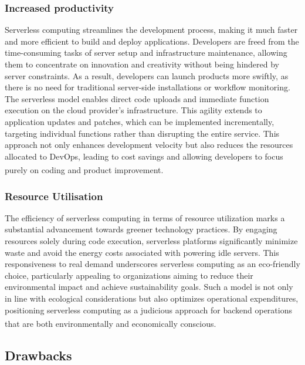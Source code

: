 \subsubsection{Increased productivity}
Serverless computing streamlines the development process, making it much faster and more efficient
to build and deploy applications. Developers are freed from the time-consuming tasks of server setup
and infrastructure maintenance, allowing them to concentrate on innovation and creativity without
being hindered by server constraints. As a result, developers can launch products more swiftly, as
there is no need for traditional server-side installations or workflow monitoring. The serverless
model enables direct code uploads and immediate function execution on the cloud provider’s
infrastructure. This agility extends to application updates and patches, which can be implemented
incrementally, targeting individual functions rather than disrupting the entire service. This
approach not only enhances development velocity but also reduces the resources allocated to DevOps,
leading to cost savings and allowing developers to focus purely on coding and product
improvement\textsuperscript{\cite{serverless_2}}\textsuperscript{\cite{serverless_3}}.

\subsubsection{Resource Utilisation}
The efficiency of serverless computing in terms of resource utilization marks a substantial
advancement towards greener technology practices. By engaging resources solely during code
execution, serverless platforms significantly minimize waste and avoid the energy costs associated
with powering idle servers. This responsiveness to real demand underscores serverless computing as
an eco-friendly choice, particularly appealing to organizations aiming to reduce their environmental
impact and achieve sustainability goals. Such a model is not only in line with ecological
considerations but also optimizes operational expenditures, positioning serverless computing as a
judicious approach for backend operations that are both environmentally and economically
conscious\textsuperscript{\cite{serverless_5}}.

\subsection{Drawbacks}
